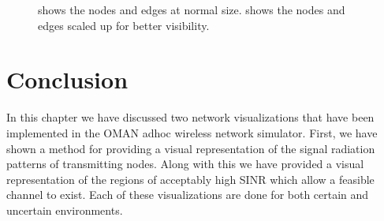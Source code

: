 \begin{figure}[ht]
\centering
{}
  \caption{ shows the nodes and edges at normal size.   shows the nodes and edges scaled up for better visibility.}
\label{fig:3d_terrain_node_scale}
\end{figure}

\section{Conclusion}
In this chapter we have discussed two network visualizations that have been implemented in the OMAN adhoc wireless network simulator.  First, we have shown a method for providing a visual representation of the signal radiation patterns of transmitting nodes.  Along with this we have provided a visual representation of the regions of acceptably high SINR which allow a feasible channel to exist.  Each of these visualizations are done for both certain and uncertain environments.

